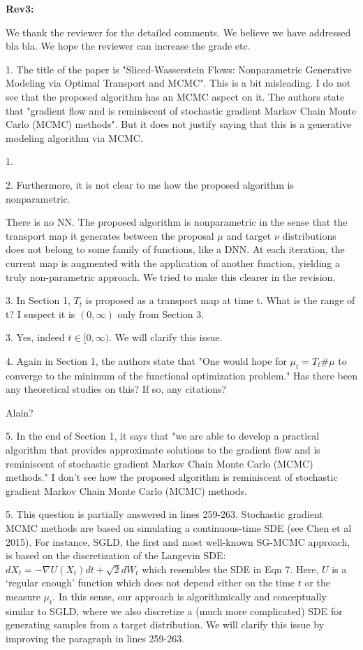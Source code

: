 \documentclass{article}
\newcommand{\rev}[1]{{\color{red} #1}}
\newcommand{\umut}[1]{{\color{blue} #1}}
\newcommand{\antoine}[1]{{\color{orange} #1}}
\begin{document}
\textbf{Rev3:}


\umut{We thank the reviewer for the detailed comments. We believe we have addressed bla bla. We hope the reviewer can increase the grade etc. }

\rev{1. The title of the paper is "Sliced-Wasserstein Flows: Nonparametric Generative Modeling via Optimal Transport and MCMC". This is a bit misleading. I do not see that the proposed algorithm has an MCMC aspect on it. The authors state that "gradient flow and is reminiscent of stochastic gradient Markov Chain Monte Carlo (MCMC) methods". But it does not justify saying that this is a generative modeling algorithm via MCMC.}

1.

\rev{2. Furthermore, it is not clear to me how the proposed algorithm is nonparametric.}

\umut{There is no NN.}
\antoine{The proposed algorithm is nonparametric in the sense that the transport map it generates between the proposal $\mu$ and target $\nu$ distributions does not belong to some family of functions, like a DNN. At each iteration, the current map is augmented with the application of another function, yielding a truly non-parametric approach. We tried to make this clearer in the revision.}

\rev{3. In Section 1, $T_t$ is proposed as a transport map at time t. What is the range of t? I suspect it is $(0, \infty)$ only from Section 3.}

3. Yes, indeed $t \in [0, \infty)$. We will clarify this issue.

\rev{4. Again in Section 1, the authors state that "One would hope for $\mu_t = T_t \#\mu$ to converge to the minimum of the functional optimization problem." Has there been any theoretical studies on this? If so, any citations?}

\umut{Alain?}

\rev{5. In the end of Section 1, it says that "we are able to develop a practical algorithm that provides approximate solutions to the gradient flow and is reminiscent of stochastic gradient Markov Chain Monte Carlo (MCMC) methods." I don't see how the proposed algorithm is reminiscent of stochastic gradient Markov Chain Monte Carlo (MCMC) methods.}

5. This question is partially answered in lines 259-263. Stochastic gradient MCMC methods are based on simulating a continuous-time SDE (see Chen et al 2015). For instance, SGLD, the first and most well-known SG-MCMC approach, is based on the discretization of the Langevin SDE: $d X_t = - \nabla U(X_t) dt + \sqrt{2} dW_t$ which resembles the SDE in Eqn 7. Here, $U$ is a `regular enough' function which does not depend either on the time $t$ or the measure $\mu_t$. In this sense, our approach is algorithmically and conceptually similar to SGLD, where we also discretize a (much more complicated) SDE for generating samples from a target distribution. We will clarify this issue by improving the paragraph in lines 259-263.
\end{document}
